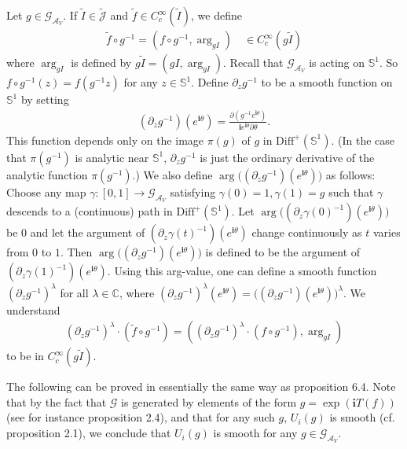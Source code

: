 \documentclass[12pt,a4paper]{article}
\theoremstyle{definition}
\theoremstyle{plain}
\newcommand{\wtd}{\widetilde}
\newcommand{\Diffp}{\mathrm{Diff}^+}
\newcommand{\GAV}{\mathscr G_{\mathcal A_V}}
\newcommand{\scr}{\mathscr}
\newcommand{\Jtd}{\widetilde{\mathcal J}}
\newcommand{\im}{\mathbf{i}}
\newcommand{\mbb}{\mathbb}
\numberwithin{equation}{subsection}
\begin{document}
Let $g\in\GAV$. If $\wtd I\in\Jtd$ and $\wtd f\in C_c^\infty(\wtd I)$, we define 
\begin{align}
\wtd f\circ g^{-1}=(f\circ g^{-1},\arg_{gI})\quad \in C_c^\infty(g\wtd I)
\end{align}
where $\arg_{gI}$ is defined by $g\wtd I=(gI,\arg_{gI})$.  Recall that $\GAV$ is acting on $\mbb S^1$. So $f\circ g^{-1}(z)=f(g^{-1}z)$ for any $z\in\mbb S^1$. Define $\partial_zg^{-1}$ to be a smooth function on $\mbb S^1$ by setting
\begin{align}
(\partial_zg^{-1})(e^{\im \theta})=\frac{\partial (g^{-1}e^{\im\theta})}{\im e^{\im\theta}\partial\theta}.
\end{align}
This function depends only on the image $\pi(g)$ of $g$ in $\Diffp(\mbb S^1)$. (In the case that $\pi(g^{-1})$ is analytic near $\mbb S^1$, $\partial_zg^{-1}$ is just the ordinary derivative of the analytic function $\pi(g^{-1})$.) We also define $\arg \big((\partial_zg^{-1})(e^{\im \theta})\big)$ as follows: Choose any map  $\gamma:[0,1]\rightarrow\GAV$ satisfying $\gamma(0)=1,\gamma(1)=g$ such that $\gamma$ descends to a (continuous) path in $\Diffp(\mbb S^1)$. Let  $\arg \big((\partial_z\gamma(0)^{-1})(e^{\im \theta})\big)$ be $0$ and let the argument of $(\partial_z\gamma(t)^{-1})(e^{\im \theta})$ change continuously as $t$ varies from $0$ to $1$. Then $\arg \big((\partial_zg^{-1})(e^{\im \theta})\big)$ is defined to be the argument of $(\partial_z\gamma(1)^{-1})(e^{\im \theta})$. Using this arg-value, one can define a smooth function $(\partial_zg^{-1})^\lambda$ for all $\lambda\in\mbb C$, where $(\partial_zg^{-1})^\lambda(e^{\im\theta})=\big((\partial_zg^{-1})(e^{\im \theta})\big)^\lambda$. We understand
\begin{align*}
(\partial_zg^{-1})^\lambda\cdot  (\wtd f\circ g^{-1})=((\partial_zg^{-1})^\lambda\cdot(f\circ g^{-1}),\arg_{gI})
\end{align*}
to be in $C_c^\infty(g\wtd I)$. 

The following can be proved in essentially the same way as \cite{CKLW18} proposition 6.4. Note that  by the fact that $\scr G$ is generated by elements of the form $g=\exp(\im T(f))$ (see for instance \cite{Gui21a} proposition 2.4), and that for any such $g$, $U_i(g)$ is smooth (cf. \cite{TL99} proposition 2.1), we conclude that $U_i(g)$ is smooth for any $g\in\GAV$.
\end{document}
